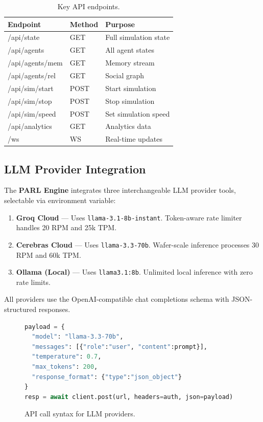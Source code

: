 \documentclass[10pt,conference]{IEEEtran}
\begin{document}
\begin{table}[ht]
\centering
\caption{Key API endpoints.}
\label{tab:api}
\scriptsize
\begin{tabular}{@{}llp{3.8cm}@{}}
\toprule
\textbf{Endpoint} & \textbf{Method} & \textbf{Purpose} \\
\midrule
/api/state        & GET  & Full simulation state \\
/api/agents       & GET  & All agent states \\
/api/agents/mem   & GET  & Memory stream \\
/api/agents/rel   & GET  & Social graph \\
/api/sim/start    & POST & Start simulation \\
/api/sim/stop     & POST & Stop simulation \\
/api/sim/speed    & POST & Set simulation speed \\
/api/analytics    & GET  & Analytics data \\
/ws               & WS   & Real-time updates \\
\bottomrule
\end{tabular}
\end{table}

\subsection{LLM Provider Integration}

The \textbf{PARL Engine} integrates three interchangeable LLM provider tools, selectable via environment variable:

\begin{enumerate}
    \item \textbf{Groq Cloud} --- Uses \texttt{llama-3.1-8b-instant}. Token-aware rate limiter handles 20 RPM and 25k TPM.
    \item \textbf{Cerebras Cloud} --- Uses \texttt{llama-3.3-70b}. Wafer-scale inference processes 30 RPM and 60k TPM.
    \item \textbf{Ollama (Local)} --- Uses \texttt{llama3.1:8b}. Unlimited local inference with zero rate limits.
\end{enumerate}

All providers use the OpenAI-compatible chat completions schema with JSON-structured responses.

\begin{figure}[ht]
\begin{lstlisting}[language=Python]
payload = {
  "model": "llama-3.3-70b",
  "messages": [{"role":"user", "content":prompt}],
  "temperature": 0.7,
  "max_tokens": 200,
  "response_format": {"type":"json_object"}
}
resp = await client.post(url, headers=auth, json=payload)
\end{lstlisting}
\vspace{-4pt}
\caption{API call syntax for LLM providers.}
\label{fig:code_call}
\end{figure}
\end{document}
